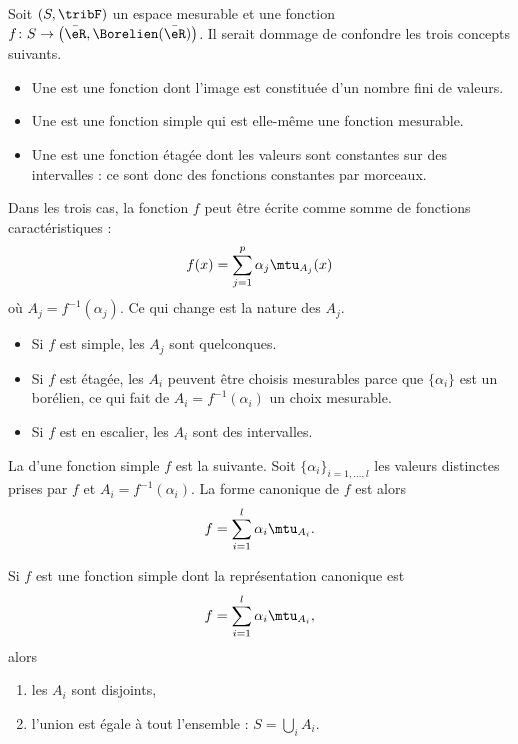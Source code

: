 \begin{definition}\label{DefBPCxdel}
	Soit \( (S,\tribF)\) un espace mesurable et une fonction \( f\colon S\to \big( \bar\eR,\Borelien(\bar\eR) \big)\). Il serait dommage de confondre les trois concepts suivants.
	\begin{itemize}
		\item
		      Une  est une fonction dont l'image est constituée d'un nombre fini de valeurs.
		\item
		      Une  est une fonction simple qui est elle-même une fonction mesurable.
		\item
		      Une  est une fonction étagée dont les valeurs sont constantes sur des intervalles : ce sont donc des fonctions constantes par morceaux.
	\end{itemize}
\end{definition}

Dans les trois cas, la fonction \( f\) peut être écrite comme somme de fonctions caractéristiques :
\begin{equation}
	f(x)=\sum_{j=1}^p\alpha_j\mtu_{A_j}(x)
\end{equation}
où \( A_j=f^{-1}(\alpha_j)\). Ce qui change est la nature des \( A_j\).

\begin{itemize}
	\item Si \( f\) est  simple, les \( A_j\) sont quelconques.
	\item Si \( f\) est étagée, les \( A_i\) peuvent être choisis mesurables parce que \( \{\alpha_i \}\) est un borélien, ce qui fait de \( A_i=f^{-1}(\alpha_i)\) un choix mesurable.
	\item Si \( f\) est en escalier, les \( A_i\) sont des intervalles.
\end{itemize}

\begin{definition}
	La  d'une fonction simple \( f\) est la suivante. Soit \( \{ \alpha_i \}_{i=1,\ldots, l}\) les valeurs distinctes prises par \( f\) et \( A_i=f^{-1}(\alpha_i)\). La forme canonique de \( f\) est alors
	\begin{equation}
		f=\sum_{i=1}^l\alpha_i\mtu_{A_i}.
	\end{equation}
\end{definition}

\begin{lemma}   \label{LEMooNWLTooCDuRQI}
	Si \( f\) est une fonction simple dont la représentation canonique est
	\begin{equation}
		f=\sum_{i=1}^l\alpha_i\mtu_{A_i},
	\end{equation}
	alors
	\begin{enumerate}
		\item
		      les \( A_i\) sont disjoints,
		\item
		      l'union est égale à tout l'ensemble : \( S=\bigcup_iA_i\).
	\end{enumerate}
\end{lemma}

